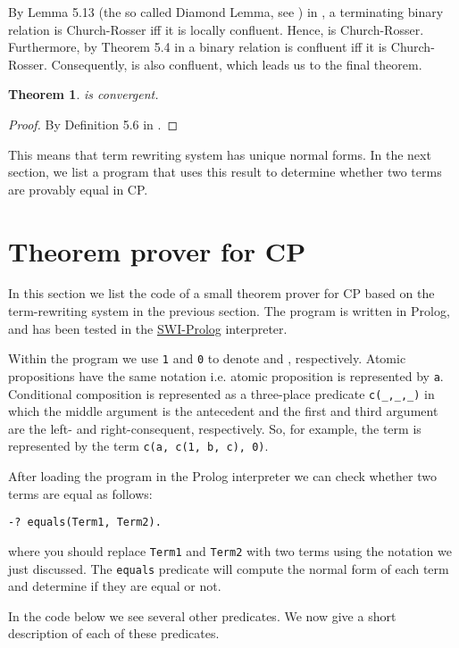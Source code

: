 \documentclass[a4paper,twoside,openright]{report}
\newtheorem{thm}[theorem]{Theorem}
\begin{document}
By Lemma 5.13 (the so called Diamond Lemma, see \cite{newman}) in \cite{rewriting}, a terminating binary relation is Church-Rosser iff it is locally confluent. Hence,  is Church-Rosser. Furthermore, by Theorem 5.4 in \cite{rewriting} a binary relation is confluent iff it is Church-Rosser. Consequently,  is also confluent, which leads us to the final theorem.

\begin{thm}
 is convergent.
\end{thm}
\begin{proof}
By Definition 5.6 in \cite{rewriting}.
\end{proof}

This means that term rewriting system  has unique normal forms. In the next section, we list a program that uses this result to determine whether two terms are provably equal in CP.

\section{Theorem prover for CP}

In this section we list the code of a small theorem prover for CP based on the term-rewriting system  in the previous section. The program is written in Prolog, and has been tested in the \href{http://www.swi-prolog.org}{SWI-Prolog} interpreter.

Within the program we use \verb|1| and \verb|0| to denote  and , respectively. Atomic propositions have the same notation i.e. atomic proposition  is represented by \verb|a|. Conditional composition is represented as a three-place predicate \verb|c(_,_,_)| in which the middle argument is the antecedent and the first and third argument are the left- and right-consequent, respectively. So, for example, the term  is represented by the term \verb|c(a, c(1, b, c), 0)|.

After loading the program in the Prolog interpreter we can check whether two terms are equal as follows:
\begin{verbatim}
-? equals(Term1, Term2).
\end{verbatim}
where you should replace \verb|Term1| and \verb|Term2| with two terms using the notation we just discussed. The \verb|equals| predicate will compute the normal form of each term and determine if they are equal or not.

In the code below we see several other predicates. We now give a short description of each of these predicates.
\end{document}
